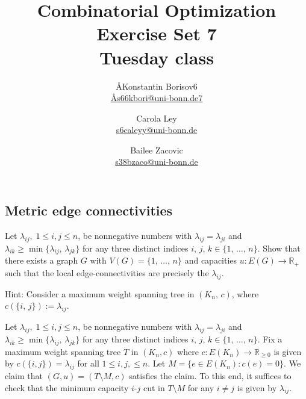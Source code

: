 \documentclass{article}
\title{Combinatorial Optimization \\ Exercise Set 7 \\ Tuesday class}
\author{
  \AA{Konstantin Borisov}{6} \\
  \href{mailto:\AA{s66kbori@uni-bonn.de}{7}}{\AA{s66kbori@uni-bonn.de}{7}}
  \and
  Carola Ley \\
  \href{mailto:s6caleyy@uni-bonn.de}{s6caleyy@uni-bonn.de}
  \and
  Bailee Zacovic \\
  \href{mailto:s38bzaco@uni-bonn.de}{s38bzaco@uni-bonn.de}
}
\newcommand{\R}{\mathbb{R}}
\begin{document}
  \maketitle

  \setcounter{section}{7}
  \subsection{Metric edge connectivities}
  \begin{centerframebox}
    Let $\lambda_{ij},\; 1 \leq i, j \leq n$, be nonnegative numbers with $\lambda_{ij} = \lambda_{ji}$ and
    $\lambda_{ik} \geq \min\{\lambda_{ij},\, \lambda_{jk}\}$ for any three distinct indices $i,\, j,\, k \in \{1,\, \dots,\, n\}$.
    Show that there exists a graph $G$ with $V(G) = \{1,\, \dots,\, n\}$ and capacities $u: E(G) \to \R_+$ such
    that the local edge-connectivities are precisely the $\lambda_{ij}$.

    Hint: Consider a maximum weight spanning tree in $(K_n,\, c)$, where $c(\{i,\, j\}) := \lambda_{ij}$.
  \end{centerframebox}
  Let $\lambda_{ij},\; 1 \leq i, j \leq n$, be nonnegative numbers with $\lambda_{ij} = \lambda_{ji}$ and $\lambda_{ik} \geq \min\{\lambda_{ij},\, \lambda_{jk}\}$ for any three distinct indices $i,\, j,\, k \in \{1,\, \dots,\, n\}$. Fix a maximum weight spanning tree $T$ in $(K_n,c)$ where $c:E(K_n)\rightarrow \mathbb{R}_{\geq 0}$ is given by $c(\{i,j\})=\lambda_{ij}$ for all $1\leq i,j,\leq n.$ Let $M=\{e\in E(K_n):c(e)=0\}.$ We claim that $(G,u)=(T\setminus M,c)$ satisfies the claim. To this end, it suffices to check that the minimum capacity $i$-$j$ cut in $T\setminus M$ for any $i\neq j$ is given by $\lambda_{ij}.$
\end{document}
